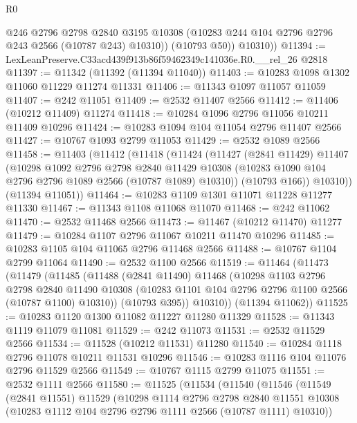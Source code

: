 \begin{lexlean}{R0}
\begin{coremodule}
            @246
            @2796
            @2798
            @2840
            @3195
            @10308
            (@10283 @244 @104 @2796 @2796 @243 @2566 (@10787 @243) @10310))
          (@10793 @50))
        @10310))
@11394 := LexLeanPreserve.C33acd439f913b86f59462349c141036e.R0.__rel_26 @2818
@11397 := @11342 (@11392 (@11394 @11040))
@11403 := @10283 @1098 @1302 @11060 @11229 @11274 @11331
@11406 := @11343 @1097 @11057 @11059
@11407 := @242 @11051
@11409 := @2532 @11407 @2566
@11412 := @11406 (@10212 @11409) @11274
@11418 := @10284 @1096 @2796 @11056 @10211 @11409 @10296
@11424 := @10283 @1094 @104 @11054 @2796 @11407 @2566
@11427 := @10767 @1093 @2799 @11053
@11429 := @2532 @1089 @2566
@11458 := @11403
    (@11412
      (@11418
        (@11424
          (@11427
            (@2841 @11429)
            @11407
            (@10298
              @1092
              @2796
              @2798
              @2840
              @11429
              @10308
              (@10283 @1090 @104 @2796 @2796 @1089 @2566 (@10787 @1089) @10310))
            (@10793 @166))
          @10310))
      (@11394 @11051))
@11464 := @10283 @1109 @1301 @11071 @11228 @11277 @11330
@11467 := @11343 @1108 @11068 @11070
@11468 := @242 @11062
@11470 := @2532 @11468 @2566
@11473 := @11467 (@10212 @11470) @11277
@11479 := @10284 @1107 @2796 @11067 @10211 @11470 @10296
@11485 := @10283 @1105 @104 @11065 @2796 @11468 @2566
@11488 := @10767 @1104 @2799 @11064
@11490 := @2532 @1100 @2566
@11519 := @11464
    (@11473
      (@11479
        (@11485
          (@11488
            (@2841 @11490)
            @11468
            (@10298
              @1103
              @2796
              @2798
              @2840
              @11490
              @10308
              (@10283 @1101 @104 @2796 @2796 @1100 @2566 (@10787 @1100) @10310))
            (@10793 @395))
          @10310))
      (@11394 @11062))
@11525 := @10283 @1120 @1300 @11082 @11227 @11280 @11329
@11528 := @11343 @1119 @11079 @11081
@11529 := @242 @11073
@11531 := @2532 @11529 @2566
@11534 := @11528 (@10212 @11531) @11280
@11540 := @10284 @1118 @2796 @11078 @10211 @11531 @10296
@11546 := @10283 @1116 @104 @11076 @2796 @11529 @2566
@11549 := @10767 @1115 @2799 @11075
@11551 := @2532 @1111 @2566
@11580 := @11525
    (@11534
      (@11540
        (@11546
          (@11549
            (@2841 @11551)
            @11529
            (@10298
              @1114
              @2796
              @2798
              @2840
              @11551
              @10308
              (@10283 @1112 @104 @2796 @2796 @1111 @2566 (@10787 @1111) @10310))

\end{coremodule}
\end{lexlean}
